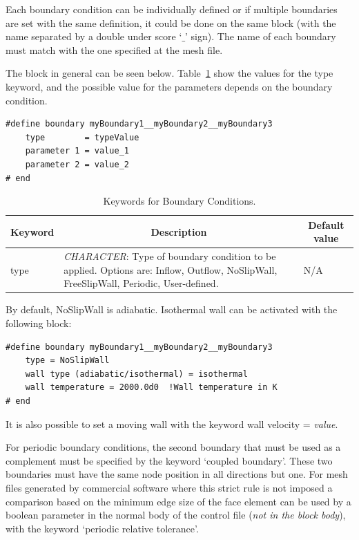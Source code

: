 \documentclass[a4paper,10pt]{report}
\begin{document}
Each boundary condition can be individually defined or if multiple boundaries are set with the same definition, it could be done on the same block (with the name separated by a double under score `$\_$' sign). The name of each boundary must match with the one specified at the mesh file.

The block in general can be seen below. Table~\ref{tab:BC} show the values for the type keyword, and the possible value for the parameters depends on the boundary condition.

\begin{lstlisting}
#define boundary myBoundary1__myBoundary2__myBoundary3
	type        = typeValue
	parameter 1 = value_1
	parameter 2 = value_2
# end
\end{lstlisting}


\begin{table}[h]
\caption{Keywords for Boundary Conditions.}\label{tab:BC}

\begin{tabular}{|p{4cm}|p{10cm}|p{2.2cm}|}
\hline
\multicolumn{1}{|c|}{\textbf{Keyword}} & \multicolumn{1}{c|}{\textbf{Description}} & \multicolumn{1}{c|}{\textbf{Default value}} \\ \hline

type 	&
		\textit{CHARACTER}: Type of boundary condition to be applied. Options are: Inflow, Outflow, NoSlipWall, FreeSlipWall, Periodic, User-defined. &
							N/A \\ \hline

\end{tabular}
\end{table}

By default, NoSlipWall is adiabatic. Isothermal wall can be activated with the following block:

\begin{lstlisting}
#define boundary myBoundary1__myBoundary2__myBoundary3
	type = NoSlipWall
	wall type (adiabatic/isothermal) = isothermal
	wall temperature = 2000.0d0  !Wall temperature in K
# end
\end{lstlisting}

It is also possible to set a moving wall with the keyword wall velocity = \emph{value}. 

For periodic boundary conditions, the second boundary that must be used as a complement must be specified by the keyword `coupled boundary'. These two boundaries must have the same node position in all directions but one. For mesh files generated by commercial software where this strict rule is not imposed a comparison based on the minimum edge size of the face element can be used by a boolean parameter in the normal body of the control file (\emph{not in the block body}), with the keyword `periodic relative tolerance'.
\end{document}
